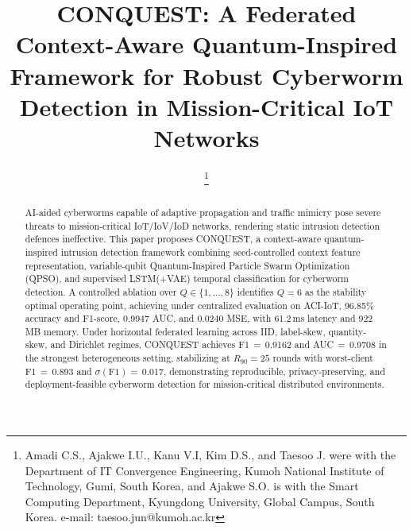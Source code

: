 \documentclass[conference]{IEEEtran}
\begin{document}
\title{%
CONQUEST: A Federated Context-Aware Quantum-Inspired Framework for Robust Cyberworm Detection in Mission-Critical IoT Networks
}

\author{

 \thanks{Amadi C.S., Ajakwe I.U.,  Kanu V.I, Kim D.S., and Taesoo J. were with the Department of IT Convergence
    Engineering, Kumoh National
    Institute of Technology, Gumi, South Korea, and Ajakwe S.O. is with the Smart Computing Department, Kyungdong University, Global Campus, South Korea. e-mail: taesoo.jun@kumoh.ac.kr}
}

\maketitle

\begin{abstract}
AI-aided cyberworms capable of adaptive propagation and traffic mimicry pose severe threats to mission-critical IoT/IoV/IoD networks, rendering static intrusion detection defences ineffective. This paper proposes CONQUEST, a context-aware quantum-inspired intrusion detection framework combining seed-controlled context feature representation, variable-qubit Quantum-Inspired Particle Swarm Optimization (QPSO), and supervised LSTM(+VAE) temporal classification for cyberworm 
detection. A controlled ablation over $Q\in\{1,\dots,8\}$ identifies $Q{=}6$ as the stability optimal operating point, achieving under centralized evaluation on ACI-IoT, 96.85\% accuracy and F1-score, 0.9947 AUC, and 0.0240 MSE, with 61.2\,ms latency and 922\,MB memory. Under horizontal federated learning 
across IID, label-skew, quantity-skew, and Dirichlet regimes, CONQUEST achieves F1\,${=}$\,0.9162 and AUC\,${=}$\,0.9708 in the strongest heterogeneous setting, stabilizing at $R_{90}{=}25$ rounds with worst-client F1\,${=}$\,0.893 and $\sigma(\mathrm{F1}){=}$\,0.017, demonstrating reproducible, 
privacy-preserving, and deployment-feasible cyberworm detection for mission-critical distributed environments.
\end{abstract}
\end{document}
